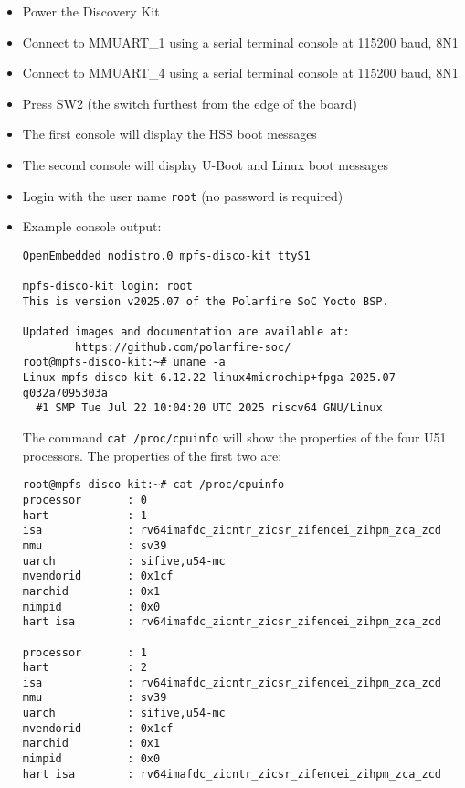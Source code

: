 \begin{itemize}
\item Power the Discovery Kit
\item Connect to MMUART\_1 using a serial terminal console at 115200 baud, 8N1
\item Connect to MMUART\_4 using a serial terminal console at 115200 baud, 8N1
\item Press SW2 (the switch furthest from the edge of the board)
\item The first console will display the HSS boot messages
\item The second console will display U-Boot and Linux boot messages
\item Login with the user name \verb+root+ (no password is required)
\item Example console output:

\begin{verbatim}
OpenEmbedded nodistro.0 mpfs-disco-kit ttyS1

mpfs-disco-kit login: root
This is version v2025.07 of the Polarfire SoC Yocto BSP.

Updated images and documentation are available at:
        https://github.com/polarfire-soc/
root@mpfs-disco-kit:~# uname -a
Linux mpfs-disco-kit 6.12.22-linux4microchip+fpga-2025.07-g032a7095303a
  #1 SMP Tue Jul 22 10:04:20 UTC 2025 riscv64 GNU/Linux
\end{verbatim}
%
The command \verb+cat /proc/cpuinfo+ will show the properties of
the four U51 processors. The properties of the first two are:
%
\begin{verbatim}
root@mpfs-disco-kit:~# cat /proc/cpuinfo
processor       : 0
hart            : 1
isa             : rv64imafdc_zicntr_zicsr_zifencei_zihpm_zca_zcd
mmu             : sv39
uarch           : sifive,u54-mc
mvendorid       : 0x1cf
marchid         : 0x1
mimpid          : 0x0
hart isa        : rv64imafdc_zicntr_zicsr_zifencei_zihpm_zca_zcd

processor       : 1
hart            : 2
isa             : rv64imafdc_zicntr_zicsr_zifencei_zihpm_zca_zcd
mmu             : sv39
uarch           : sifive,u54-mc
mvendorid       : 0x1cf
marchid         : 0x1
mimpid          : 0x0
hart isa        : rv64imafdc_zicntr_zicsr_zifencei_zihpm_zca_zcd
\end{verbatim}

\end{itemize}

\clearpage
